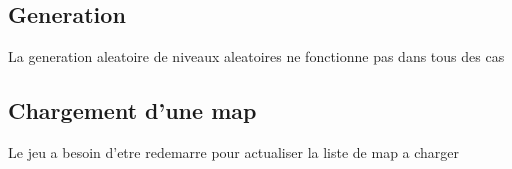 \documentclass[../main.tex]{subfiles}
\begin{document}
\subsection{Generation}
La generation aleatoire de niveaux aleatoires ne fonctionne pas dans tous des cas
\subsection{Chargement d'une map}
Le jeu a besoin d'etre redemarre pour actualiser la liste de map a charger
\end{document}
